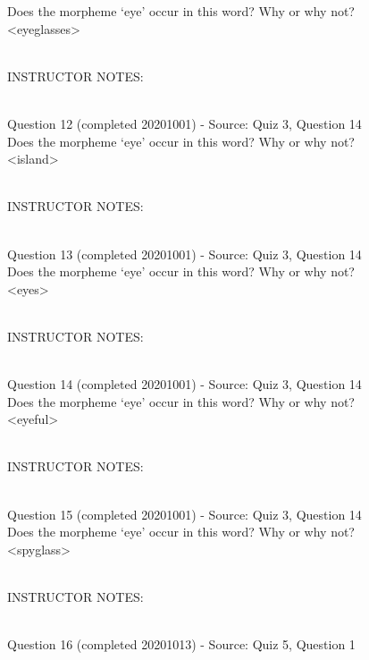 \documentclass[12pt]{article}
\begin{document}
Does the morpheme ‘eye’ occur in this word? Why or why not?\\

<eyeglasses>


~\\
INSTRUCTOR NOTES: 


~\\

{\large Question 12} (completed 20201001) - Source: Quiz 3, Question 14\\

Does the morpheme ‘eye’ occur in this word? Why or why not?\\

<island>


~\\
INSTRUCTOR NOTES: 


~\\

{\large Question 13} (completed 20201001) - Source: Quiz 3, Question 14\\

Does the morpheme ‘eye’ occur in this word? Why or why not?\\

<eyes>


~\\
INSTRUCTOR NOTES: 


~\\

{\large Question 14} (completed 20201001) - Source: Quiz 3, Question 14\\

Does the morpheme ‘eye’ occur in this word? Why or why not?\\

<eyeful>


~\\
INSTRUCTOR NOTES: 


~\\

{\large Question 15} (completed 20201001) - Source: Quiz 3, Question 14\\

Does the morpheme ‘eye’ occur in this word? Why or why not?\\

<spyglass>


~\\
INSTRUCTOR NOTES: 


~\\

{\large Question 16} (completed 20201013) - Source: Quiz 5, Question 1\\
\end{document}
